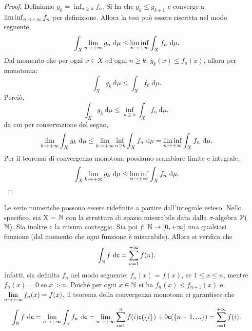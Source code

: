 \documentclass[Completo.tex]{subfiles}
\begin{document}
	\begin{proof}
		Definiamo $g_k = \inf_{n \geq k} f_n$. Si ha che $g_k \leq g_{k+1}$ e converge a $\liminf_{n \rightarrow +\infty} f_n$ per definizione. Allora la tesi può essere riscritta nel modo seguente,
		\begin{equation*}
		\int_X \lim_{n \ra +\infty} g_n \ \mathrm{d}\mu \leq \liminf_{n \ra +\infty} \int_X f_n \ \mathrm{d}\mu.
		\end{equation*}
		Dal momento che per ogni $x \in X$ ed ogni $n \geq k$, $g_k(x) \leq f_n(x)$, allora per monotonia:
		\begin{equation*}
		\int_X g_k \ \mathrm{d}\mu \leq \int_X f_n \ \mathrm{d}\mu.
		\end{equation*}
		Perciò,
		\begin{equation*}
		\int_X g_k \ \mathrm{d}\mu \leq \inf_{n \geq k} \int_X f_n \ \mathrm{d}\mu,
		\end{equation*}
		da cui per conservazione del segno,
		\begin{equation*}
		\lim_{k \rightarrow +\infty} \int_X g_k \ \mathrm{d}\mu \leq \lim_{k \rightarrow +\infty} \inf_{n \geq k} \int_X f_n \ \mathrm{d}\mu = \liminf_{n \rightarrow +\infty} \int_X f_n \ \mathrm{d}\mu.
		\end{equation*}
		Per il teorema di convergenza monotona possiamo scambiare limite e integrale,
		\begin{equation*}
		\int_X \lim_{k \rightarrow +\infty} g_k \ \mathrm{d}\mu \leq \liminf_{n \rightarrow +\infty} \int_X f_n \ \mathrm{d}\mu.
		\end{equation*}
	\end{proof}
	Le serie numeriche possono essere ridefinite a partire dall'integrale esteso. Nello specifico, sia X = $\bb[N]$ con la struttura di spazio misurabile data dalla $\sigma$-algebra $\eu[P]$($\bb[N]$). Sia inoltre $\mathsf{c}$ la misura conteggio. Sia poi $f$: $\bb[N] \ra [0, +\infty]$ una qualsiasi funzione (dal momento che ogni funzione è misurabile). Allora si verifica che
	\begin{equation*}
	\int_{\bb[N]} f \ \mathrm{d}\mathsf{c} = \sum_{n=1}^{+\infty} f(n).
	\end{equation*}
	Infatti, sia definita $f_n$ nel modo seguente: $f_n(x)$ = $f(x)$, se $1 \leq x \leq n$, mentre $f_n(x) = 0$ se $x > n$. Poiché per ogni $x \in \bb[N]$ si ha $f_n(x) \leq f_{n+1}(x)$ e $\lim\limits_{n \rightarrow +\infty}f_n(x) = f(x)$, il teorema della convergenza monotona ci garantisce che
	\begin{equation*}
	\int_{\bb[N]} f \ \mathrm{d}\mathsf{c} = \lim_{n \ra +\infty} \int_{\bb[N]} f_n \ \mathrm{d}\mathsf{c} = \lim_{n \ra +\infty} \sum_{i = 1}^{n} f(i) \mathsf{c}(\{i\}) + 0\mathsf{c}(\{n+1, ...\}) = \sum_{i = 1}^{+\infty} f(i).
	\end{equation*}
\end{document}
